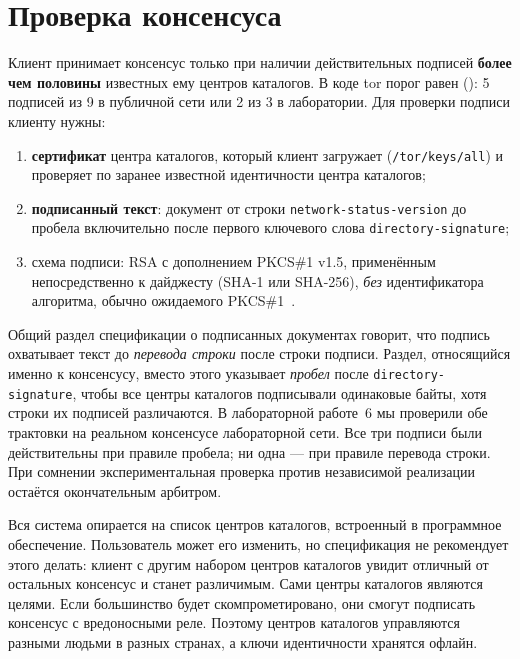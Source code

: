 \section{Проверка консенсуса}\label{sec:dir-firme}

Клиент принимает консенсус только при наличии действительных подписей \textbf{более чем половины} известных ему центров каталогов. В коде tor порог равен  (): 5 подписей из 9 в публичной сети или 2 из 3 в лаборатории. Для проверки подписи клиенту нужны:
\begin{enumerate}
  \item \textbf{сертификат} центра каталогов, который клиент загружает (\nolinkurl{/tor/keys/all}) и проверяет по заранее известной идентичности центра каталогов;
  \item \textbf{подписанный текст}: документ от строки \texttt{network-status-version} до пробела включительно после первого ключевого слова \texttt{directory-signature};
  \item схема подписи: RSA с дополнением PKCS\#1 v1.5, применённым непосредственно к дайджесту (SHA-1 или SHA-256), \emph{без} идентификатора алгоритма, обычно ожидаемого PKCS\#1~.
\end{enumerate}

\begin{approfondimento}
Общий раздел спецификации о подписанных документах говорит, что подпись охватывает текст до \emph{перевода строки} после строки подписи. Раздел, относящийся именно к консенсусу, вместо этого указывает \emph{пробел} после \texttt{directory-signature}, чтобы все центры каталогов подписывали одинаковые байты, хотя строки их подписей различаются. В лабораторной работе~6 мы проверили обе трактовки на реальном консенсусе лабораторной сети. Все три подписи были действительны при правиле пробела; ни одна --- при правиле перевода строки. При сомнении экспериментальная проверка против независимой реализации остаётся окончательным арбитром.
\end{approfondimento}

\begin{attenzione}
Вся система опирается на список центров каталогов, встроенный в программное обеспечение. Пользователь может его изменить, но спецификация не рекомендует этого делать: клиент с другим набором центров каталогов увидит отличный от остальных консенсус и станет различимым. Сами центры каталогов являются целями. Если большинство будет скомпрометировано, они смогут подписать консенсус с вредоносными реле. Поэтому центров каталогов управляются разными людьми в разных странах, а ключи идентичности хранятся офлайн.
\end{attenzione}

